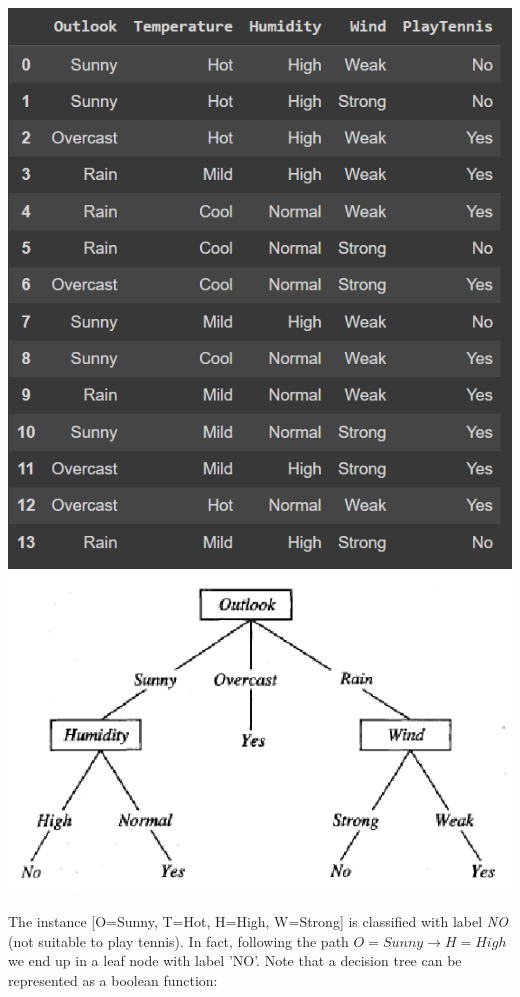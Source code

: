 \begin{center}
    \includegraphics[scale=0.5]{images/layTennisDataset.png}
    \includegraphics[scale=0.45]{images/decision tree playtennis.png}
\end{center}
The instance [O=Sunny, T=Hot, H=High, W=Strong] is classified with label \textit{NO} (not suitable to play tennis). In fact, following the path $O=Sunny \rightarrow H=High$ we end up in a leaf node with label 'NO'. Note that a decision tree can be represented as a boolean function:
